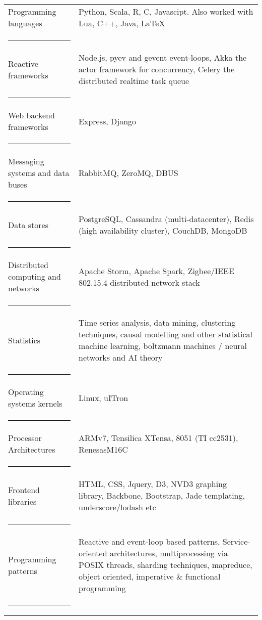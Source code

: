 \documentclass[10pt]{article} %
\begin{document}
\normalsize
\begin{tabularx}{\textwidth}{>{\setlength\hsize{0.7\hsize}}X >{\setlength\hsize{1.3\hsize}}X}
	Programming languages & Python, Scala, R, C, Javascipt. Also worked with Lua, C++, Java, \LaTeX \\
	\textcolor{Apricot}{\rule{16cm}{0.2pt}}\\

	Reactive frameworks & Node.js, pyev and gevent event-loops, Akka the actor framework for concurrency, Celery the distributed realtime task queue \\
	\textcolor{Apricot}{\rule{16cm}{0.2pt}}\\

	Web backend frameworks & Express, Django \\
	\textcolor{Apricot}{\rule{16cm}{0.2pt}}\\

	Messaging systems and \newline data buses & RabbitMQ, ZeroMQ, DBUS \\
	\textcolor{Apricot}{\rule{16cm}{0.2pt}}\\

	Data stores & PostgreSQL, Cassandra (multi-datacenter), Redis (high availability cluster), CouchDB, MongoDB \\
	\textcolor{Apricot}{\rule{16cm}{0.2pt}}\\

	Distributed computing \newline and networks & Apache Storm, Apache Spark, Zigbee/IEEE 802.15.4 distributed network stack \\
	\textcolor{Apricot}{\rule{16cm}{0.2pt}}\\

	Statistics & Time series analysis, data mining, clustering techniques, causal modelling and other statistical machine learning, boltzmann machines / neural networks and AI theory \\
	\textcolor{Apricot}{\rule{16cm}{0.2pt}}\\

	Operating systems kernels & Linux, uITron \\
	\textcolor{Apricot}{\rule{16cm}{0.2pt}}\\
	
	Processor Architectures & ARMv7, Tensilica XTensa, 8051 (TI cc2531), RenesasM16C \\
	\textcolor{Apricot}{\rule{16cm}{0.2pt}}\\

	Frontend libraries & HTML, CSS, Jquery, D3, NVD3 graphing library, Backbone, Bootstrap, Jade templating, underscore/lodash etc \\
	\textcolor{Apricot}{\rule{16cm}{0.2pt}}\\

	Programming patterns & Reactive and event-loop based patterns, Service-oriented architectures, multiprocessing via POSIX threads, sharding techniques, mapreduce, object oriented, imperative \& functional programming \\
	\textcolor{Apricot}{\rule{16cm}{0.2pt}}\\

\end{tabularx}
\end{document}

